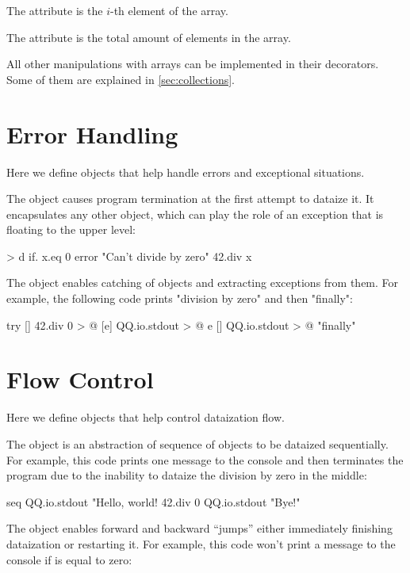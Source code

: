 \documentclass[sigplan,11pt,nonacm,natbib=false]{acmart}
\newcommand\aff[1]{\ff{\textcolor{gray}{$\star$}#1}}
\newcommand\adeff[1]{\aff{\textcolor{blue!50!black}{\textbf{#1}}}}
\begin{document}
The attribute \adeff{at} is the $i$-th element of the array.

The attribute \adeff{length} is the total amount of elements in the array.

All other manipulations with arrays can be implemented in their decorators. Some of them are explained in \cref{sec:collections}.

\section{Error Handling}\label{sec:errors}

Here we define objects that help handle errors and exceptional situations.

The object \adeff{error} causes program termination at the first attempt to dataize it.
It encapsulates any other object, which can play the role of an exception that is
floating to the upper level:

\begin{ffcode}
[x] > d
  if.
    x.eq 0
    error "Can't divide by zero"
    42.div x
\end{ffcode}

The object \adeff{try} enables catching of \aff{error} objects and extracting exceptions from them.
For example, the following code prints "division by zero" and then "finally":

\begin{ffcode}
try
  []
    42.div 0 > @
  [e]
    QQ.io.stdout > @
      e
  []
    QQ.io.stdout > @
      "finally"
\end{ffcode}

\section{Flow Control}\label{sec:flow}

Here we define objects that help control dataization flow.

The object \adeff{seq} is an abstraction of sequence of objects to be dataized sequentially. For example, this code prints one message to the console and then terminates the program due to the inability to dataize the division by zero in the middle:

\begin{ffcode}
seq
  QQ.io.stdout "Hello, world!
  42.div 0
  QQ.io.stdout "Bye!"
\end{ffcode}

The object \adeff{goto} enables forward and backward ``jumps'' either immediately finishing dataization or restarting it. For example, this code won't print a message to the console if  is equal to zero:
\end{document}
